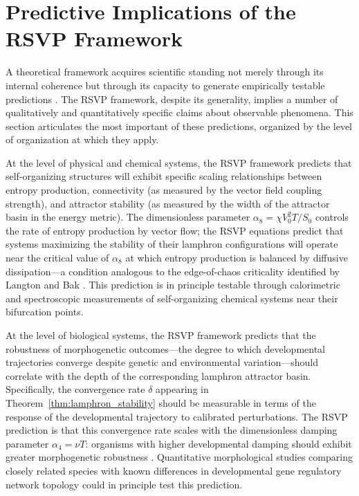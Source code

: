 \documentclass[12pt]{article}
\begin{document}
\section{Predictive Implications of the RSVP Framework}
\label{sec:predictions}

A theoretical framework acquires scientific standing not merely through its internal coherence but through its capacity to generate empirically testable predictions \cite{smolin2006}. The RSVP framework, despite its generality, implies a number of qualitatively and quantitatively specific claims about observable phenomena. This section articulates the most important of these predictions, organized by the level of organization at which they apply.

At the level of physical and chemical systems, the RSVP framework predicts that self-organizing structures will exhibit specific scaling relationships between entropy production, connectivity (as measured by the vector field coupling strength), and attractor stability (as measured by the width of the attractor basin in the energy metric). The dimensionless parameter $\alpha_8 = \chi V_0^2 T / S_0$ controls the rate of entropy production by vector flow; the RSVP equations predict that systems maximizing the stability of their lamphron configurations will operate near the critical value of $\alpha_8$ at which entropy production is balanced by diffusive dissipation---a condition analogous to the edge-of-chaos criticality identified by Langton \cite{langton1990} and Bak \cite{bak1996}. This prediction is in principle testable through calorimetric and spectroscopic measurements of self-organizing chemical systems near their bifurcation points.

At the level of biological systems, the RSVP framework predicts that the robustness of morphogenetic outcomes---the degree to which developmental trajectories converge despite genetic and environmental variation---should correlate with the depth of the corresponding lamphron attractor basin. Specifically, the convergence rate $\delta$ appearing in Theorem~\ref{thm:lamphron_stability} should be measurable in terms of the response of the developmental trajectory to calibrated perturbations. The RSVP prediction is that this convergence rate scales with the dimensionless damping parameter $\alpha_4 = \nu T$: organisms with higher developmental damping should exhibit greater morphogenetic robustness \cite{goodwin1994,kauffman1993}. Quantitative morphological studies comparing closely related species with known differences in developmental gene regulatory network topology could in principle test this prediction.
\end{document}
